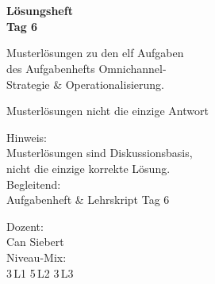 \documentclass[11pt,a4paper,oneside]{article}
\begin{document}
\begin{titlepage}
  \pagestyle{empty}
  \vspace*{1.5cm}
  \\[2pt]
  \noindent{\color{lpAccent}\rule{\linewidth}{1.2pt}}\\[4pt]

  \vspace{3cm}
  {\sffamily\fontsize{30}{34}\selectfont\bfseries\color{lpInk}Lösungsheft\\Tag 6\par}

  \vspace{0.7cm}
  {\sffamily\large\color{lpGray}Musterlösungen zu den elf Aufgaben\\des Aufgabenhefts \textendash{} Omnichannel-\\Strategie \& Operationalisierung.\par}

  \vspace{1.5cm}
  {\caveatfont\LARGE\color{lpGreen}Musterlösungen \textperiodcentered{} nicht die einzige Antwort}\par

  \vfill

  \noindent\begin{minipage}{0.55\linewidth}
    {\sffamily\footnotesize\color{lpGray}Hinweis:}\\
    {\sffamily\small\color{lpInk}Musterlösungen sind Diskussionsbasis,\\nicht die einzige korrekte Lösung.}\\[10pt]
    {\sffamily\footnotesize\color{lpGray}Begleitend:}\\
    {\sffamily\small\color{lpInk}Aufgabenheft \& Lehrskript Tag 6}
  \end{minipage}\hfill
  \begin{minipage}{0.4\linewidth}
    \raggedleft
    {\sffamily\footnotesize\color{lpGray}Dozent:}\\
    {\sffamily\small\color{lpInk}Can Siebert}\\[10pt]
    {\sffamily\footnotesize\color{lpGray}Niveau-Mix:}\\
    {\sffamily\small\color{lpInk}3\,L1 \textperiodcentered{} 5\,L2 \textperiodcentered{} 3\,L3}
  \end{minipage}

  \vspace{0.5cm}
  \noindent{\color{lpAccent}\rule{\linewidth}{0.6pt}}
\end{titlepage}
\end{document}
